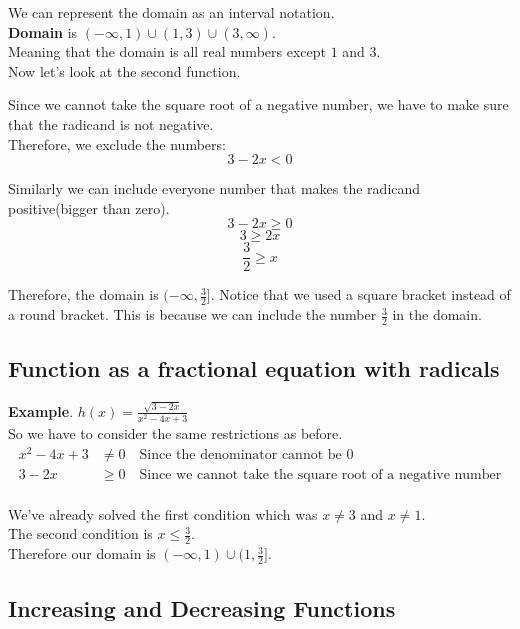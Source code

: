 We can represent the domain as an interval notation. \\
\textbf{Domain} is $(-\infty, 1) \cup (1, 3) \cup (3, \infty)$. \\
Meaning that the domain is all real numbers except $1$ and $3$. \\

Now let's look at the second function.

Since we cannot take the square root of a negative number, we have to make sure that the radicand is not negative. \\

Therefore, we exclude the numbers:
$$ 3-2x < 0$$

Similarly we can include everyone number that makes the radicand positive(bigger than zero). \\
$$ 3-2x \ge 0$$
$$ 3 \ge 2x$$
$$ \frac{3}{2} \ge x$$

Therefore, the domain is $(-\infty, \frac{3}{2}]$.
Notice that we used a square bracket instead of a round bracket. This is because we can include the number $\frac{3}{2}$ in the domain. \\

\subsection{Function as a fractional equation with radicals}

\textbf{Example}. $\displaystyle h(x)=\frac{\sqrt{3-2x}}{x^2-4x+3}$ \\

So we have to consider the same restrictions as before. \\

\begin{align*}
	x^2-4x+3 &\neq 0 \quad \text{Since the denominator cannot be 0} \\
	3-2x &\ge 0 \quad \text{Since we cannot take the square root of a negative number} \\
\end{align*}

We've already solved the first condition which was $x\neq3$ and $x\neq1$. \\
The second condition is $x\le\frac{3}{2}$. \\

Therefore our domain is $(-\infty, 1) \cup (1, \frac{3}{2}]$.

\subsection{Increasing and Decreasing Functions}

